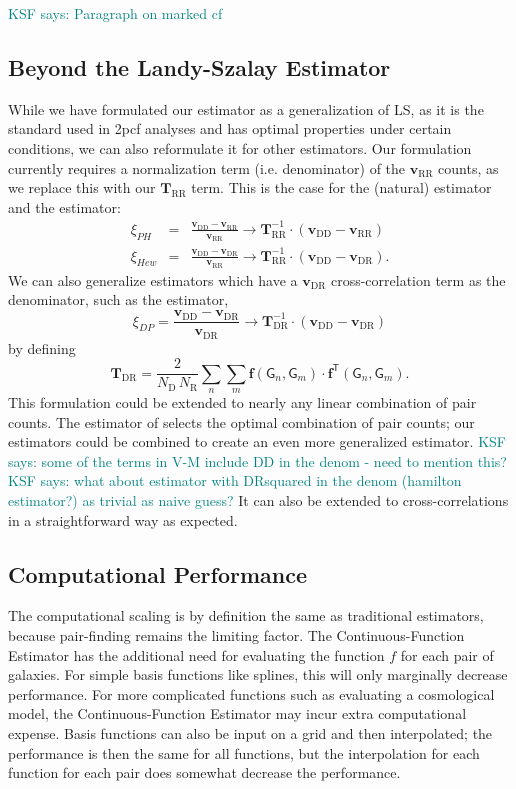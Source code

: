 \documentclass[modern]{aastex62}
\newcommand{\cf}{2pcf\xspace} %
\newcommand{\Est}{The Continuous-Function Estimator\xspace}
\newcommand{\est}{the Continuous-Function Estimator\xspace}
\newcommand{\LS}{LS\xspace}
\newcommand{\inv}{^{-1}}
\newcommand{\T}{^{\mathsf{T}}}
\newcommand{\bld}[1]{\bm{#1}} %
\newcommand{\vv}[1]{\bld{v}_\mathrm{#1}}
\newcommand{\TT}[1]{\bld{T}_\mathrm{#1}}
\newcommand{\ff}{\bld{f}}
\newcommand{\NN}[1]{N_\mathrm{#1}}
\newcommand{\GG}[1]{\mathsf{G}_{#1}}
\newcommand{\KSF}[1]{\textcolor{teal}{KSF says: #1}}
\begin{document}
\KSF{Paragraph on marked cf}

\label{ref:beyondls}
\subsection{Beyond the Landy-Szalay Estimator}

While we have formulated our estimator as a generalization of \LS, as it is the standard used in \cf analyses and has optimal properties under certain conditions, we can also reformulate it for other estimators.
Our formulation currently requires a normalization term (i.e. denominator) of the $\vv{RR}$ counts, as we replace this with our $\TT{RR}$ term.
This is the case for the \cite{PeeblesHauser1974} (natural) estimator and the \cite{Hewett1982} estimator:
\begin{eqnarray}
    \xi_{PH} &=& \frac{\vv{DD} - \vv{RR}}{\vv{RR}} \rightarrow \TT{RR}\inv \cdot \left( \vv{DD} - \vv{RR} \right)\\
    \xi_{Hew} &=& \frac{\vv{DD} - \vv{DR}}{\vv{RR}} \rightarrow \TT{RR}\inv \cdot \left( \vv{DD} - \vv{DR} \right).
\end{eqnarray}
We can also generalize estimators which have a $\vv{DR}$ cross-correlation term as the denominator, such as the \cite{DavisPeebles1983} estimator,
\begin{equation}
    \xi_{DP} = \frac{\vv{DD} - \vv{DR}}{\vv{DR}} \rightarrow \TT{DR}\inv \cdot \left( \vv{DD} - \vv{DR} \right)
\end{equation}
by defining
\begin{equation}
    \TT{DR} = \frac{2}{\NN{D}\,\NN{R}} \sum_{n} \sum_{m} \ff(\GG{n}, \GG{m}) \cdot \ff\T(\GG{n}, \GG{m}).
\end{equation}
This formulation could be extended to nearly any linear combination of pair counts.
The estimator of \cite{VargasMagana2013} selects the optimal combination of pair counts; our estimators could be combined to create an even more generalized estimator.
\KSF{some of the terms in V-M include DD in the denom - need to mention this?}
\KSF{what about estimator with DRsquared in the denom (hamilton estimator?) as trivial as naive guess?}
It can also be extended to cross-correlations in a straightforward way as expected.


\subsection{Computational Performance}

The computational scaling is by definition the same as traditional estimators, because pair-finding remains the limiting factor.
\Est has the additional need for evaluating the function $f$ for each pair of galaxies.
For simple basis functions like splines, this will only marginally decrease performance.
For more complicated functions such as evaluating a cosmological model, \est may incur extra computational expense.
Basis functions can also be input on a grid and then interpolated; the performance is then the same for all functions, but the interpolation for each function for each pair does somewhat decrease the performance.
\end{document}
